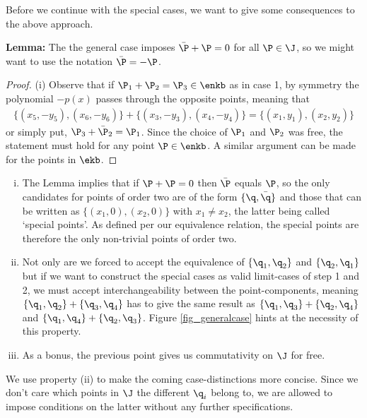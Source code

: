 Before we continue with the special cases, we want to give some consequences to the above approach.%


\textbf{Lemma:} The the general case imposes $\bar \P + \P = 0$ for all $\P \in \J$, so we might want to use the notation $\bar \P = -\P$.
\vspace{-3mm}
\begin{proof}
  (i) Observe that if $\P_1+\P_2=\P_3 \in \enkb$ as in case 1, by symmetry the polynomial $-p(x)$ passes through the opposite points, meaning that
  \begin{align*}
  	\{ (x_5,-y_5),(x_6,-y_6) \} + \{ (x_3,-y_3),(x_4,-y_4) \} = \{ (x_1,y_1),(x_2,y_2) \}
  \end{align*}
  or simply put, $\P_3+\bar \P_2=\P_1$. Since the choice of $\P_1$ and $\P_2$ was free, the statement must hold for any point $\P \in \enkb$. A similar argument can be made for the points in $\ekb$.
\end{proof}

\begin{remark}\hfill
\begin{enumerate}[(i)]
  \item The Lemma implies that if $\P+\P=0$ then $\bar \P$ equals $\P$, so the only candidates for points of order two are of the form $\{ \q, \bar \q \}$ and those that can be written as $\{ (x_1,0),(x_2,0) \}$ with $x_1 \neq x_2$, the latter being called `special points'. As defined per our equivalence relation, the special points are therefore the only non-trivial points of order two.

  \item Not only are we forced to accept the equivalence of $\{\q_1,\q_2\}$ and $\{\q_2,\q_1\}$ but if we want to construct the special cases as valid limit-cases of step 1 and 2, we must accept interchangeability between the point-components, meaning $\{\q_1,\q_2\} + \{\q_3,\q_4\}$ has to give the same result as $\{\q_1,\q_3\}+\{\q_2,\q_4\}$ and $\{\q_1,\q_4\}+\{\q_2,\q_3\}$. Figure \ref{fig_generalcase} hints at the necessity of this property.

  \item As a bonus, the previous point gives us commutativity on $\J$ for free.
\end{enumerate}
\end{remark}

We use property (ii) to make the coming case-distinctions more concise. Since we don't care which points in $\J$ the different $\q_i$ belong to, we are allowed to impose conditions on the latter without any further specifications.